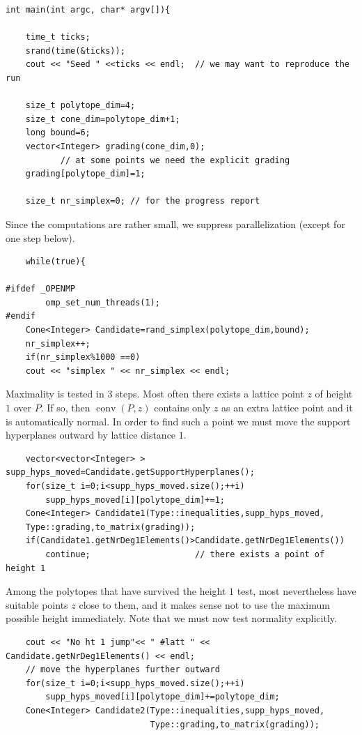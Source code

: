 \begin{small}
\begin{Verbatim}
int main(int argc, char* argv[]){

    time_t ticks;
    srand(time(&ticks));
    cout << "Seed " <<ticks << endl;  // we may want to reproduce the run

    size_t polytope_dim=4;
    size_t cone_dim=polytope_dim+1;
    long bound=6;
    vector<Integer> grading(cone_dim,0); 
           // at some points we need the explicit grading
    grading[polytope_dim]=1;

    size_t nr_simplex=0; // for the progress report
\end{Verbatim}
Since the computations are rather small, we suppress parallelization (except for one step below).
\begin{Verbatim}
    while(true){

#ifdef _OPENMP
        omp_set_num_threads(1);
#endif
    Cone<Integer> Candidate=rand_simplex(polytope_dim,bound);
    nr_simplex++;
    if(nr_simplex%1000 ==0)
    cout << "simplex " << nr_simplex << endl;
\end{Verbatim}
Maximality is tested in $3$ steps. Most often there exists a lattice point $z$ of height $1$ over $P$. If so, then $\operatorname{conv}(P,z)$ contains only $z$ as an extra lattice point and it is automatically normal. In order to find such a point we must move the support hyperplanes outward by lattice distance $1$.
\begin{Verbatim}
    vector<vector<Integer> > supp_hyps_moved=Candidate.getSupportHyperplanes();
    for(size_t i=0;i<supp_hyps_moved.size();++i)
        supp_hyps_moved[i][polytope_dim]+=1;
    Cone<Integer> Candidate1(Type::inequalities,supp_hyps_moved, 
    Type::grading,to_matrix(grading));
    if(Candidate1.getNrDeg1Elements()>Candidate.getNrDeg1Elements()) 
        continue;                     // there exists a point of height 1
\end{Verbatim}
Among the polytopes that have survived the height $1$ test, most nevertheless have suitable points $z$ close to them, and it makes sense not to use the maximum possible height immediately. Note that we must now test normality explicitly.
\begin{Verbatim}
    cout << "No ht 1 jump"<< " #latt " << Candidate.getNrDeg1Elements() << endl; 
    // move the hyperplanes further outward
    for(size_t i=0;i<supp_hyps_moved.size();++i)
        supp_hyps_moved[i][polytope_dim]+=polytope_dim; 
    Cone<Integer> Candidate2(Type::inequalities,supp_hyps_moved,
                             Type::grading,to_matrix(grading));

\end{Verbatim}
\end{small}
